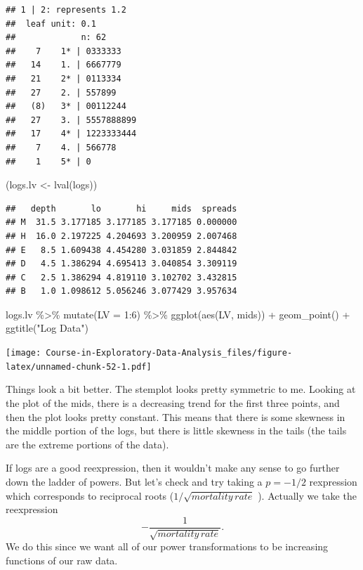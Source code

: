 \documentclass[
]{book}
\newenvironment{Shaded}{\begin{snugshade}}{\end{snugshade}}
\newcommand{\AttributeTok}[1]{\textcolor[rgb]{0.77,0.63,0.00}{#1}}
\newcommand{\DecValTok}[1]{\textcolor[rgb]{0.00,0.00,0.81}{#1}}
\newcommand{\FunctionTok}[1]{\textcolor[rgb]{0.00,0.00,0.00}{#1}}
\newcommand{\NormalTok}[1]{#1}
\newcommand{\OtherTok}[1]{\textcolor[rgb]{0.56,0.35,0.01}{#1}}
\newcommand{\SpecialCharTok}[1]{\textcolor[rgb]{0.00,0.00,0.00}{#1}}
\newcommand{\StringTok}[1]{\textcolor[rgb]{0.31,0.60,0.02}{#1}}
\begin{document}
\begin{verbatim}
## 1 | 2: represents 1.2
##  leaf unit: 0.1
##             n: 62
##    7    1* | 0333333
##   14    1. | 6667779
##   21    2* | 0113334
##   27    2. | 557899
##   (8)   3* | 00112244
##   27    3. | 5557888899
##   17    4* | 1223333444
##    7    4. | 566778
##    1    5* | 0
\end{verbatim}

\begin{Shaded}
\begin{Highlighting}[]
\NormalTok{(logs.lv }\OtherTok{\textless{}{-}} \FunctionTok{lval}\NormalTok{(logs))}
\end{Highlighting}
\end{Shaded}

\begin{verbatim}
##   depth       lo       hi     mids  spreads
## M  31.5 3.177185 3.177185 3.177185 0.000000
## H  16.0 2.197225 4.204693 3.200959 2.007468
## E   8.5 1.609438 4.454280 3.031859 2.844842
## D   4.5 1.386294 4.695413 3.040854 3.309119
## C   2.5 1.386294 4.819110 3.102702 3.432815
## B   1.0 1.098612 5.056246 3.077429 3.957634
\end{verbatim}

\begin{Shaded}
\begin{Highlighting}[]
\NormalTok{logs.lv }\SpecialCharTok{\%\textgreater{}\%} \FunctionTok{mutate}\NormalTok{(}\AttributeTok{LV =} \DecValTok{1}\SpecialCharTok{:}\DecValTok{6}\NormalTok{) }\SpecialCharTok{\%\textgreater{}\%} 
  \FunctionTok{ggplot}\NormalTok{(}\FunctionTok{aes}\NormalTok{(LV, mids)) }\SpecialCharTok{+}
  \FunctionTok{geom\_point}\NormalTok{() }\SpecialCharTok{+} \FunctionTok{ggtitle}\NormalTok{(}\StringTok{"Log Data"}\NormalTok{)}
\end{Highlighting}
\end{Shaded}

\texttt{[image: Course-in-Exploratory-Data-Analysis\_files/figure-latex/unnamed-chunk-52-1.pdf]}

Things look a bit better. The stemplot looks pretty symmetric to me. Looking at the plot of the mids, there is a decreasing trend for the first three points, and then the plot looks pretty constant. This means that there is some skewness in the middle portion of the logs, but there is little skewness in the tails (the tails are the extreme portions of the data).

If logs are a good reexpression, then it wouldn't make any sense to go further down the ladder of powers. But let's check and try taking a \(p = -1/2\) rexpression which corresponds to reciprocal roots (\(1 / \sqrt{mortality \, rate}\) ). Actually we take the reexpression
\[
- \frac{1}{\sqrt{mortality \, rate}}.
\]
We do this since we want all of our power transformations to be increasing functions of our raw data.
\end{document}
